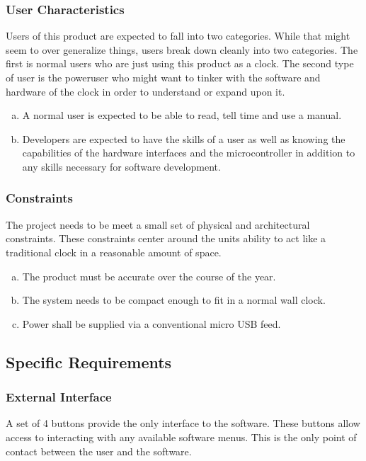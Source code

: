 \documentclass[onecolumn, draftclsnofoot,10pt, compsoc]{IEEEtran}
\begin{document}
\subsubsection{User Characteristics}
Users of this product are expected to fall into two categories. While that might
seem to over generalize things, users break down cleanly into two categories.
The first is normal users who are just using this product as a clock. The second
type of user is the poweruser who might want to tinker with the software and
hardware of the clock in order to understand or expand upon it.
\begin{enumerate}[a)]
  \item A normal user is expected to be able to read, tell time and use a manual.
  \item Developers are expected to have the skills of a user as well as knowing the
capabilities of the hardware interfaces and the microcontroller in addition to
any skills necessary for software development.
\end{enumerate}

\subsubsection{Constraints}
The project needs to be meet a small set of physical and architectural constraints. These
constraints center around the units ability to act like a traditional clock in a reasonable
amount of space.
\begin{enumerate}[a)]
  \item The product must be accurate over the course of the year.
  \item The system needs to be compact enough to fit in a normal wall clock.
  \item Power shall be supplied via a conventional micro USB feed.
\end{enumerate}

\subsection{Specific Requirements}
\subsubsection{External Interface}
A set of 4 buttons provide the only interface to the software. These buttons
allow access to interacting with any available software menus. This is the only
point of contact between the user and the software.
\end{document}
